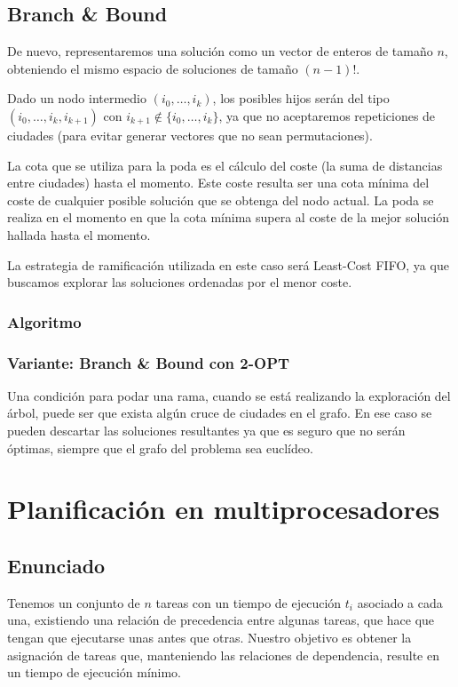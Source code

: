 \documentclass[a4paper, 11pt]{article} %
\begin{document}
	
        \small
  	\texttt{}
        \normalsize

  \subsection{Branch \& Bound}
  De nuevo, representaremos una solución como un vector de enteros de tamaño $n$, obteniendo el mismo espacio de soluciones de tamaño $(n-1)!$.
  
  Dado un nodo intermedio $(i_0, \dots, i_k)$, los posibles hijos serán del tipo\\ $(i_0, \dots, i_k, i_{k+1})$ con $i_{k+1} \notin \{i_0, \dots, i_k\}$, ya que no aceptaremos repeticiones de ciudades (para evitar generar vectores que no sean permutaciones).
  
  La cota que se utiliza para la poda es el cálculo del coste (la suma de distancias entre ciudades) hasta el momento. Este coste resulta ser una cota mínima del coste de cualquier posible solución que se obtenga del nodo actual.
  La poda se realiza en el momento en que la cota mínima supera al coste de la mejor solución hallada hasta el momento.
  
  La estrategia de ramificación utilizada en este caso será Least-Cost FIFO, ya que buscamos explorar las soluciones ordenadas por el menor coste.
  
    	\newpage
  
  \subsubsection{Algoritmo}
  
    \small
  	\texttt{}
     \normalsize
  

\subsubsection{Variante: Branch \& Bound con 2-OPT}
Una condición para podar una rama, cuando se está realizando la exploración del árbol, puede ser que exista algún cruce de ciudades en el grafo. En ese caso se pueden descartar las soluciones resultantes ya que es seguro que no serán óptimas, siempre que el grafo del problema sea euclídeo.

\section{Planificación en multiprocesadores}
  \subsection{Enunciado}
  Tenemos un conjunto de $n$ tareas con un tiempo de ejecución $t_i$ asociado a cada una, existiendo una relación de precedencia
  entre algunas tareas, que hace que tengan que ejecutarse unas antes que otras. Nuestro objetivo es obtener la asignación de tareas que, manteniendo las relaciones de dependencia, resulte en un tiempo de ejecución mínimo. 
  
\end{document}
